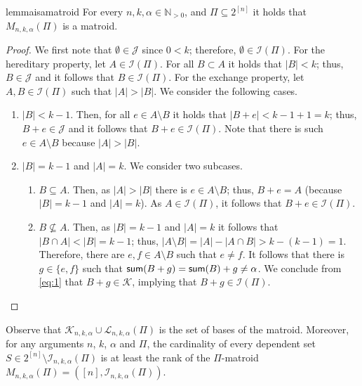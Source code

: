\documentclass[11pt,letter]{article}
\newcommand{\mm}{M_{n,k,\alpha}(\Pi)}
\newcommand{\cI}{{\mathcal{I}}}
\newcommand{\cJ}{{\mathcal{J}}}
\begin{document}
\begin{restatable}{lemma}{isamatroid}
	\label{lem:1}
	For every  $n,k,\alpha \in \mathbb{N}_{>0}$, and $\Pi \subseteq 2^{[n]}$ it holds that $\mm$ is a matroid.
\end{restatable}
	\begin{proof}
	We first note that $\emptyset \in \mathcal{J}$ since $0<k$; therefore, $\emptyset \in \cI(\Pi)$. For the hereditary property, let $A \in \cI(\Pi)$. For all $B \subset A$ it holds that $|B| < k$; thus, $B \in \mathcal{J}$ and it follows that $B \in \cI(\Pi)$. For the exchange property, let $A,B \in \cI(\Pi)$ such that $|A| > |B|$. We consider the following cases. 
	\begin{enumerate}
		\item $|B| < k-1$. Then, for all $e \in A \setminus B$ it holds that $|B+e| < k-1+1 = k$; thus, $B+e \in \cJ$ and it follows that $B+e \in \cI(\Pi)$. Note that there is such $e  \in A \setminus B$ because $|A| > |B|$. 
		
		\item $|B| = k-1$ and $|A| = k$. We consider two subcases.  
		\begin{enumerate}
			\item $B \subseteq A$. Then, as $|A| > |B|$ there is $e \in A \setminus B$; thus, $B+e = A$ (because $|B| = k-1$ and $|A| = k$). As $A \in \cI(\Pi)$, it follows that $B+e \in \cI(\Pi)$.
			
			\item $B \not\subseteq A$.  Then, as $|B| = k-1$ and $|A| = k$ it follows that $|B \cap A| < |B| = k-1$; thus, $|A \setminus B| = |A|-|A \cap B| > k - (k-1) = 1$. Therefore, there are $e,f \in A \setminus B$ such that $e \neq f$. %
			It follows that there is $g \in \{e,f\}$ such that $\textnormal{\textsf{sum}}(B+g) = \textnormal{\textsf{sum}}(B)+g \neq \alpha$. We conclude from \eqref{eq:1} that $B+g \in \mathcal{K}$,
			implying that $B+g \in \cI(\Pi)$.
		\end{enumerate}
\end{enumerate}	\end{proof}
Observe that $\mathcal{K}_{n,k,\alpha} \cup \mathcal{L}_{n,k,\alpha}(\Pi)$ is the set of bases of the matroid. Moreover, for any arguments $n$, $k$, $\alpha$ and $\Pi$,
the cardinality of every  dependent set $S\in 2^{[n]}\setminus \cI_{n,k,\alpha}(\Pi)$  is at least the rank of the $\Pi$-matroid $M_{n,k,\alpha} (\Pi)=([n],\cI_{n,k,\alpha}(\Pi))$.
\end{document}
